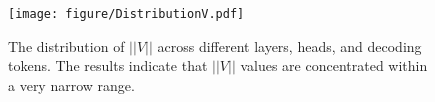 \begin{figure}[t]
    \centering
    \texttt{[image: figure/DistributionV.pdf]} 
    \caption{The distribution of  $||V||$ across different layers, heads, and decoding tokens. The results indicate that $||V||$ values are concentrated within a very narrow range.}
    \label{fig:distribution_v}
\end{figure}
